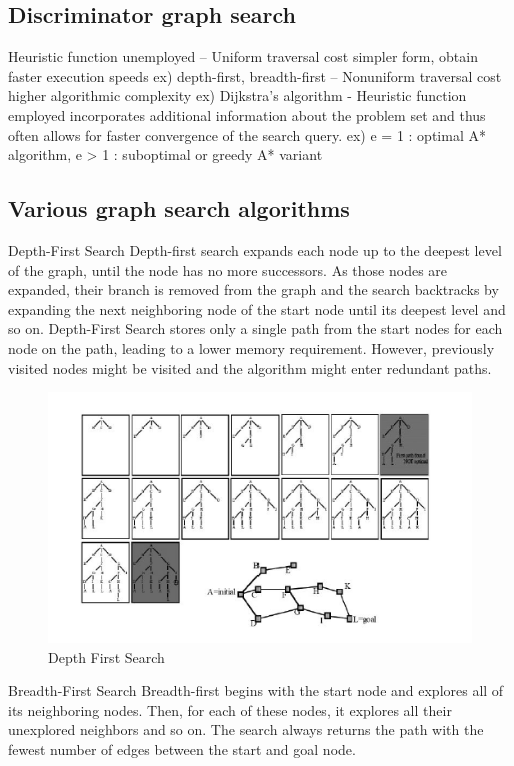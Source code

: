 \documentclass[twoside]{article}
\begin{document}
\subsection{Discriminator graph search}
Heuristic function unemployed
– Uniform traversal cost simpler form, obtain faster execution speeds 
ex) depth-first, breadth-first
– Nonuniform traversal cost higher algorithmic complexity
ex) Dijkstra’s algorithm
- Heuristic function employed incorporates additional information about the problem set and thus often allows for faster convergence of the search query.
ex) e = 1 : optimal A* algorithm, e > 1 : suboptimal or greedy A* variant

\subsection{Various graph search algorithms}
Depth-First Search
Depth-first search expands each node up to the deepest level of the graph, until the node has no more successors. As those nodes are expanded, their branch is removed from the graph and the search backtracks by expanding the next neighboring node of the start node until its deepest level and so on.
Depth-First Search stores only a single path from the start nodes for each node on the path, leading to a lower memory requirement. However, previously visited nodes might be visited and the algorithm might enter redundant paths.

\begin{figure}[h]
\begin{center}
\includegraphics{fig15_8.PNG}
\caption{Depth First Search}
\end{center}
\end{figure}

Breadth-First Search
Breadth-first begins with the start node and explores all of its neighboring nodes. Then, for each of these nodes, it explores all their unexplored neighbors and so on.
The search always returns the path with the fewest number of edges between the start and goal node.
\end{document}
